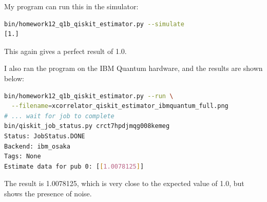 \documentclass[12pt]{extarticle}
\begin{document}
\begin{enumerate}[(a)]
My program can run this in the simulator:
\begin{lstlisting}[language=bash]
bin/homework12_q1b_qiskit_estimator.py --simulate
[1.]
\end{lstlisting}

This again gives a perfect result of 1.0.

I also ran the program on the IBM Quantum hardware, and the results are shown below:
\begin{lstlisting}[language=bash]
bin/homework12_q1b_qiskit_estimator.py --run \
  --filename=xcorrelator_qiskit_estimator_ibmquantum_full.png
# ... wait for job to complete
bin/qiskit_job_status.py crct7hpdjmqg008kemeg
Status: JobStatus.DONE
Backend: ibm_osaka
Tags: None
Estimate data for pub 0: [[1.0078125]]
\end{lstlisting}

The result is 1.0078125, which is very close to the expected value of 1.0, but shows the presence of noise.

\end{enumerate}
\end{document}
